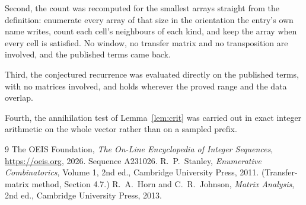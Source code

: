 \documentclass[11pt,a4paper]{article}
\theoremstyle{plain}
\theoremstyle{definition}
\begin{document}
Second, the count was recomputed for the smallest arrays straight from the definition:
enumerate every array of that size in the orientation the entry's own name writes, count each
cell's neighbours of each kind, and keep the array when every cell is satisfied. No window, no
transfer matrix and no transposition are involved, and the published terms came back.

Third, the conjectured recurrence was evaluated directly on the published terms, with no
matrices involved, and holds wherever the proved range and the data overlap.

Fourth, the annihilation test of Lemma~\ref{lem:crit} was carried out in exact integer
arithmetic on the whole vector rather than on a sampled prefix.

\begin{thebibliography}{9}
 The OEIS Foundation, \emph{The On-Line Encyclopedia of Integer
Sequences}, \url{https://oeis.org}, 2026. Sequence A231026.
 R.~P.~Stanley, \emph{Enumerative Combinatorics}, Volume 1, 2nd ed.,
Cambridge University Press, 2011. (Transfer-matrix method, Section 4.7.)
 R.~A.~Horn and C.~R.~Johnson, \emph{Matrix Analysis}, 2nd ed., Cambridge
University Press, 2013.
\end{thebibliography}
\end{document}
